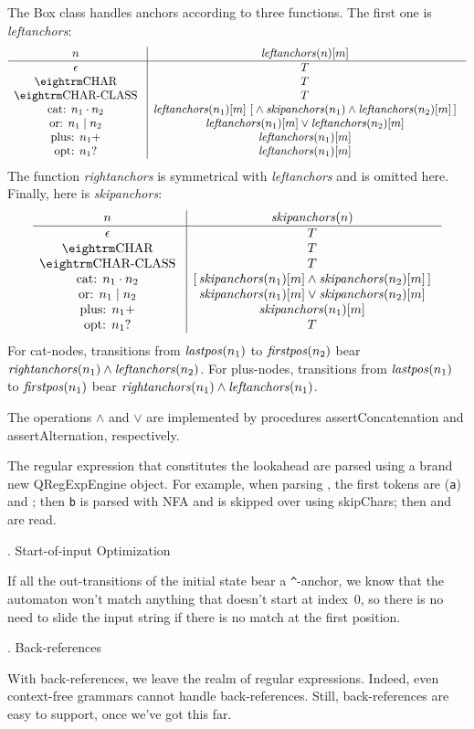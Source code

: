 The {\sf Box} class handles anchors according to three functions.  The first one is {\it leftanchors\/}:  $$\vbox{\halign{\g{#}\vrule && \g{$#$} \cr
  $n$                   & {\it leftanchors}(n)[m] \cr
\noalign{\hrule}
  $\epsilon$            & T \cr
  \tok{char}            & T \cr
  \tok{char-class}      & T \cr
  cat: $n_1 \cdot n_2$  & {\it leftanchors}(n_1)[m] \ [{} \land {\it skipanchors}(n_1) \land {\it leftanchors}(n_2)[m]\,] \cr
  or: $n_1 \mid n_2$    & {\it leftanchors}(n_1)[m] \lor {\it leftanchors}(n_2)[m] \cr
  plus: $n_1+$          & {\it leftanchors}(n_1)[m] \cr
  opt: $n_1?$           & {\it leftanchors}(n_1)[m] \cr
}}$$  The function {\it rightanchors\/} is symmetrical with {\it leftanchors} and is omitted here.  Finally, here is {\it skipanchors\/}:  $$\vbox{\halign{\g{#}\vrule && \g{$#$} \cr
  $n$                   & {\it skipanchors}(n) \cr
\noalign{\hrule}
  $\epsilon$            & T \cr
  \tok{char}            & T \cr
  \tok{char-class}      & T \cr
  cat: $n_1 \cdot n_2$  & [\,{\it skipanchors}(n_1)[m] \land {\it skipanchors}(n_2)[m]\,] \cr
  or: $n_1 \mid n_2$    & {\it skipanchors}(n_1)[m] \lor {\it skipanchors}(n_2)[m] \cr
  plus: $n_1+$          & {\it skipanchors}(n_1)[m] \cr
  opt: $n_1?$           & T \cr
}}$$  For cat-nodes, transitions from ${\it lastpos}(n_1)$ to ${\it firstpos}(n_2)$ bear ${\it rightanchors}(n_1) \land {\it leftanchors}(n_2)$.  For plus-nodes, transitions from ${\it lastpos}(n_1)$ to ${\it firstpos}(n_1)$ bear ${\it rightanchors}(n_1) \land {\it leftanchors}(n_1)$.

The operations $\land$ and $\lor$ are implemented by procedures {\sf assertConcatenation} and {\sf assertAlternation}, respectively.

The regular expression that constitutes the lookahead are parsed using a brand new {\sf QRegExpEngine} object.  For example, when parsing , the first tokens are  ({\tt a}) and ; then {\tt b} is parsed with NFA and is skipped over using {\sf skipChars}; then \lex{)} and  are read.

. Start-of-input Optimization

If all the out-transitions of the initial state bear a {\tt\^}-anchor, we know that the automaton won't match anything that doesn't start at index~$0$, so there is no need to slide the input string if there is no match at the first position.

. Back-references

With back-references, we leave the realm of regular expressions.  Indeed, even context-free grammars cannot handle back-references.  Still, back-references are easy to support, once we've got this far.

